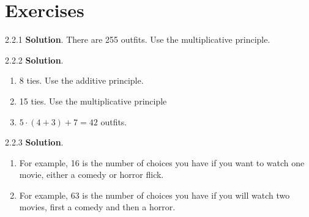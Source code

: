 \documentclass[11pt,]{book}
\theoremstyle{ptxplainnotitle}
\theoremstyle{ptxplaintitle}
\theoremstyle{ptxdefinitionnotitle}
\theoremstyle{ptxdefinitiontitle}
\theoremstyle{ptxdefinitionnotitle}
\theoremstyle{ptxdefinitiontitle}
\theoremstyle{ptxdefinitionnotitle}
\theoremstyle{ptxdefinitiontitle}
\theoremstyle{ptxdefinitiontitlenonumber}
\theoremstyle{ptxdefinitiontitlenonumber}
\numberwithin{equation}{chapter}
\begin{document}
\section*{Exercises}
\begin{divisionexercise}{2.2.1}
\textbf{Solution}.\quad%
\hypertarget{p-1038}{}%
There are 255 outfits. Use the multiplicative principle.%
\end{divisionexercise}%
\begin{divisionexercise}{2.2.2}
\textbf{Solution}.\quad%
\hypertarget{p-1055}{}%
\leavevmode%
\begin{enumerate}[label=\alph*.]
\item\hypertarget{li-457}{}\hypertarget{p-1056}{}%
8 ties.  Use the additive principle.%
\item\hypertarget{li-458}{}\hypertarget{p-1057}{}%
15 ties. Use the multiplicative principle%
\item\hypertarget{li-459}{}\hypertarget{p-1058}{}%
\(5\cdot (4+3) + 7 = 42\) outfits.%
\end{enumerate}
%
\end{divisionexercise}%
\begin{divisionexercise}{2.2.3}
\textbf{Solution}.\quad%
\hypertarget{p-1062}{}%
\leavevmode%
\begin{enumerate}[label=(\alph*)]
\item\hypertarget{li-462}{}\hypertarget{p-1063}{}%
For example, 16 is the number of choices you have if you want to watch one movie, either a comedy or horror flick.%
\item\hypertarget{li-463}{}\hypertarget{p-1064}{}%
For example, 63 is the number of choices you have if you will watch two movies, first a comedy and then a horror.%
\end{enumerate}
%
\end{divisionexercise}%
\end{document}
